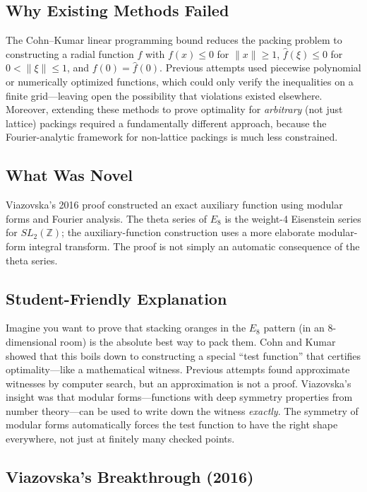 \subsection{Why Existing Methods Failed}
The Cohn--Kumar linear programming bound reduces the packing problem to constructing a radial function $f$ with $f(x) \leq 0$ for $\|x\| \geq 1$, $\hat{f}(\xi) \leq 0$ for $0 < \|\xi\| \leq 1$, and $f(0) = \hat{f}(0)$. Previous attempts used piecewise polynomial or numerically optimized functions, which could only verify the inequalities on a finite grid---leaving open the possibility that violations existed elsewhere. Moreover, extending these methods to prove optimality for \emph{arbitrary} (not just lattice) packings required a fundamentally different approach, because the Fourier-analytic framework for non-lattice packings is much less constrained.

\subsection{What Was Novel}
Viazovska's 2016 proof constructed an exact auxiliary function using modular forms and Fourier analysis. The theta series of $E_8$ is the weight-4 Eisenstein series for $SL_2(\mathbb Z)$; the auxiliary-function construction uses a more elaborate modular-form integral transform. The proof is not simply an automatic consequence of the theta series.

\subsection{Student-Friendly Explanation}
Imagine you want to prove that stacking oranges in the $E_8$ pattern (in an 8-dimensional room) is the absolute best way to pack them. Cohn and Kumar showed that this boils down to constructing a special ``test function'' that certifies optimality---like a mathematical witness. Previous attempts found approximate witnesses by computer search, but an approximation is not a proof. Viazovska's insight was that modular forms---functions with deep symmetry properties from number theory---can be used to write down the witness \emph{exactly}. The symmetry of modular forms automatically forces the test function to have the right shape everywhere, not just at finitely many checked points.

\subsection{Viazovska's Breakthrough (2016)}

